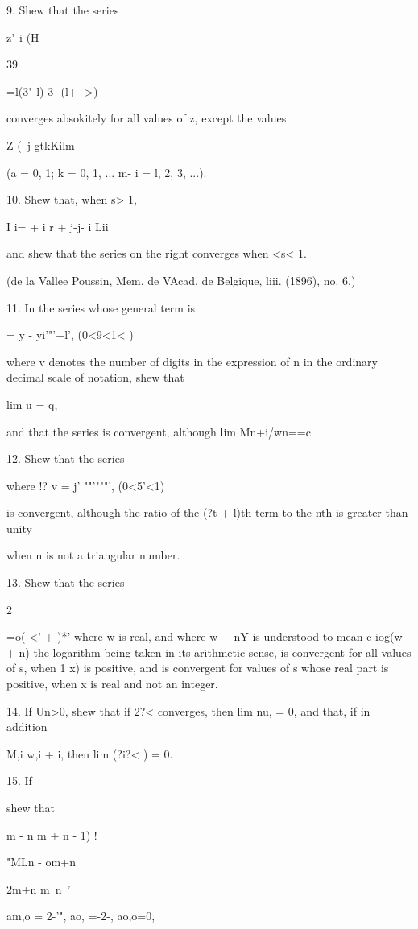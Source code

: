 9. Shew that the series

   z"-i (H-%

39

 =l(3"-l) 3 -(l+ ->)

converges absokitely for all values of z, except the values

Z-(\ j gtkKilm

(a = 0, 1; k = 0, 1, ... m-\; i = l, 2, 3, ...).

10. Shew that, when s> 1,

I i= + i r + j-j- i Lii

and shew that the series on the right converges when <s< 1.

(de la Vallee Poussin, Mem. de VAcad. de Belgique, liii. (1896), no.
6.)

11. In the series whose general term is

   = y - yi'"'+l', (0<9<1< )

where v denotes the number of digits in the expression of n in the
ordinary decimal scale of notation, shew that

lim u = q,

and that the series is convergent, although lim Mn+i/wn==c 

12. Shew that the series

where !? v = j' ""'"""', (0<5'<1)

is convergent, although the ratio of the (?t + l)th term to the nth is
greater than unity

when n is not a triangular number. 

13. Shew that the series

2

 =o( <' + )*' where w is real, and where w + nY is understood to mean
e iog(w + n) the logarithm being taken in its arithmetic sense, is
convergent for all values of s, when 1 x) is positive, and is
convergent for values of s whose real part is positive, when x is real
and not an integer.

14. If Un>0, shew that if 2?< converges, then lim nu, = 0, and that,
if in addition

M,i w,i + i, then lim (?i?< ) = 0.

15. If

shew that

m - n m + n - 1) !

"MLn - om+n

2m+n m\ n\ '

am,o = 2-'", ao, =-2-, ao,o=0,

